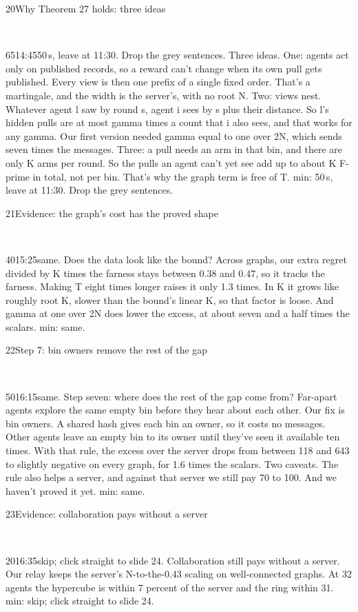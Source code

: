\documentclass[12pt,a4paper]{article}
\newcommand{\Nb}{\colorbox{nisch}{\strut\textcolor{white}{\textbf{\small Nischal}}}}
\newcommand{\cut}[1]{\textcolor{cutc}{#1}}
\newenvironment{slide}[6]
  {\begin{slidebox}{#1}{#2}{#3}{#4}{#5}{#6}\gdef\fifteen{#6}}
  {\tcblower 15 min: \fifteen\end{slidebox}}
\begin{document}
\begin{slide}{20}{Why Theorem 27 holds: three ideas}{\Nb}{65}{14:45}{50\,s, leave at 11:30. Drop the grey sentences.}
Three ideas. One: agents act only on published records, so a reward can't change when its own pull gets published.
Every view is then one prefix of a single fixed order. That's a martingale, and the width is the server's, with no
root N. Two: views nest. Whatever agent l saw by round s, agent i sees by s plus their distance. So l's hidden pulls are
at most gamma times a count that i also sees, and that works for any gamma. \cut{Our first version needed gamma equal
to one over 2N, which sends seven times the messages.} Three: a pull needs an arm in that bin, and there are only K
arms per round. \cut{So the pulls an agent can't yet see add up to about K F-prime in total, not per bin.} That's why
the graph term is free of T.
\end{slide}

\begin{slide}{21}{Evidence: the graph's cost has the proved shape}{\Nb}{40}{15:25}{same.}
Does the data look like the bound? Across graphs, our extra regret divided by K times the farness stays between 0.38
and 0.47, so it tracks the farness. Making T eight times longer raises it only 1.3 times. In K it grows like roughly
root K, slower than the bound's linear K, so that factor is loose. And gamma at one over 2N does lower the excess, at
about seven and a half times the scalars.
\end{slide}

\begin{slide}{22}{Step 7: bin owners remove the rest of the gap}{\Nb}{50}{16:15}{same.}
Step seven: where does the rest of the gap come from? Far-apart agents explore the same empty bin before they hear
about each other. Our fix is bin owners. A shared hash gives each bin an owner, so it costs no messages. Other agents
leave an empty bin to its owner until they've seen it available ten times. With that rule, the excess over the server
drops from between 118 and 643 to slightly negative on every graph, for 1.6 times the scalars. Two caveats. The rule
also helps a server, and against that server we still pay 70 to 100. And we haven't proved it yet.
\end{slide}

\begin{slide}{23}{Evidence: collaboration pays without a server}{\Nb}{20}{16:35}{skip; click straight to slide 24.}
Collaboration still pays without a server. Our relay keeps the server's N-to-the-0.43 scaling on well-connected
graphs. At 32 agents the hypercube is within 7 percent of the server and the ring within 31.
\end{slide}
\end{document}
